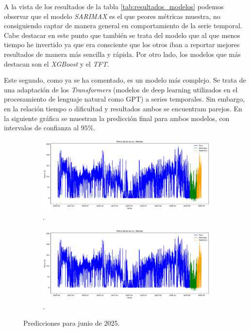 A la vista de los resultados de la tabla \ref{tab:resultados_modelos} podemos observar que el modelo \textit{SARIMAX} es el que peores métricas muestra, no consiguiendo captar de manera general en comportamiento de la serie temporal. Cabe destacar en este punto que también se trata del modelo que al que menos tiempo he invertido ya que era consciente que los otros iban a reportar mejores resultados de manera más sencilla y rápida. Por otro lado, los modelos que más destacan son el \textit{XGBoost} y el \textit{TFT}.

Este segundo, como ya se ha comentado, es un modelo más complejo. Se trata de una adaptación de los \textit{Transformers} (modelos de deep learning utilizados en el procesamiento de lenguaje natural como GPT) a series temporales. Sin embargo, en la relación tiempo o dificultad y resultados ambos se encuentram parejos. En la siguiente gráfica se muestran la predicción final para ambos modelos, con intervalos de confianza al $95\%$.
\begin{figure}[H]
\centering
\begin{subfigure}[b]{0.45\textwidth}
\centering
\includegraphics[width=\textwidth]{figuras/historico_precios.png}
\caption[Predicción mediante XGBoost]{.}
\label{PrediccionXGBoost}
\end{subfigure}
\begin{subfigure}[b]{0.45\textwidth}
\centering
\includegraphics[width=\textwidth]{figuras/historico_precios.png}
\caption[Predicción mediante TFT]{.}
\label{PrediccionTFT}
\end{subfigure}
\caption{Predicciones para junio de 2025.}
\label{PrediccionesLuz}
\end{figure}
%
